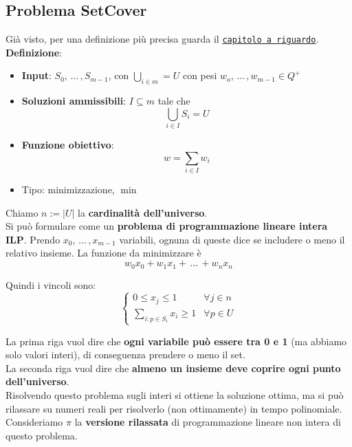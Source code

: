 \newpage

\subsection{Problema SetCover}

Già visto, per una definizione più precisa guarda il \hyperref[subsec:setcover]{\texttt{capitolo a riguardo}}.\\

\textbf{Definizione}:
\begin{itemize}
	\item \textbf{Input}: $S_0, \, \dots \, , S_{m-1}$, con $\bigcup_{i \in m} = U$ con pesi $w_o, \, \dots \, , w_{m-1} \in Q^+$
	
	\item \textbf{Soluzioni ammissibili}: $I \subseteq m$ tale che
	$$ \bigcup_{i \in I} S_i = U $$
	
	\item \textbf{Funzione obiettivo}: 
	$$ w = \sum_{i \in I} w_i $$
	
	\item Tipo: minimizzazione, $\min$
\end{itemize} 

Chiamo $n:= |U|$ la \textbf{cardinalità dell'universo}.\\

Si può formulare come un \textbf{problema di programmazione lineare intera ILP}. Prendo $x_0, \, \dots \, , x_{m-1}$ variabili, ognuna di queste dice se includere o meno il relativo insieme. La funzione da minimizzare è 
$$ w_0 x_0 + w_1 x_1 + \, \dots \, + w_n x_n $$

Quindi i vincoli sono:
$$ 
\begin{cases}
	0 \leq x_j \leq 1 & \forall j \in n \\
	\sum_{i: p \in S_i} x_i \geq 1  &\forall p \in U
\end{cases}
$$

La prima riga vuol dire che \textbf{ogni variabile può essere tra 0 e 1} (ma abbiamo solo valori interi), di conseguenza prendere o meno il set.\\
La seconda riga vuol dire che \textbf{almeno un insieme deve coprire ogni punto dell'universo}.\\

Risolvendo questo problema sugli interi si ottiene la soluzione ottima, ma si può rilassare su numeri reali per risolverlo (non ottimamente) in tempo polinomiale. Consideriamo $\hat \pi$ la \textbf{versione rilassata} di programmazione lineare non intera di questo problema.\\

